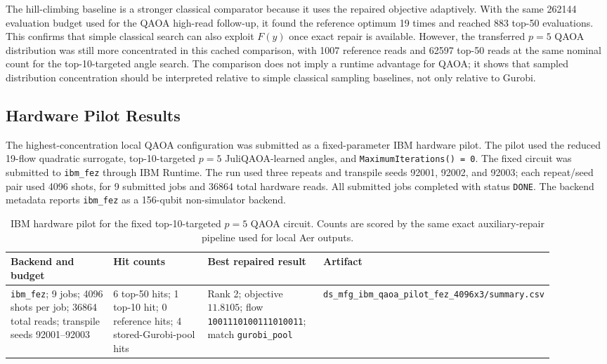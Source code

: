 The hill-climbing baseline is a stronger classical comparator because it uses
the repaired objective adaptively. With the same 262144 evaluation budget used
for the QAOA high-read follow-up, it found the reference optimum 19 times and
reached 883 top-50 evaluations. This confirms that simple classical search can
also exploit $F(y)$ once exact repair is available. However, the transferred
$p=5$ QAOA distribution was still more concentrated in this cached comparison,
with 1007 reference reads and 62597 top-50 reads at the same nominal count for the
top-10-targeted angle search. The
comparison does not imply a runtime advantage for QAOA; it shows that sampled
distribution concentration should be interpreted relative to simple classical
sampling baselines, not only relative to Gurobi.

\subsection{Hardware Pilot Results}
\label{subsec:ds-mfg-hardware-pilot}

The highest-concentration local QAOA configuration was submitted as a fixed-parameter IBM
hardware pilot. The pilot used the reduced 19-flow quadratic surrogate,
top-10-targeted $p=5$ JuliQAOA-learned angles, and
\texttt{MaximumIterations() = 0}. The fixed circuit was submitted to
\texttt{ibm\_fez} through IBM Runtime. The run used three repeats and
transpile seeds 92001, 92002, and 92003; each repeat/seed pair used 4096 shots,
for 9 submitted jobs and 36864 total hardware reads. All submitted jobs
completed with status \texttt{DONE}. The backend metadata reports
\texttt{ibm\_fez} as a 156-qubit non-simulator backend.

\begin{table}[t]
\centering
\scriptsize
\caption{IBM hardware pilot for the fixed top-10-targeted $p=5$ QAOA circuit.
Counts are scored by the same exact auxiliary-repair pipeline used for local
Aer outputs.}
\label{tab:ds-mfg-hardware-pilot}
\begin{tabular}{p{0.24\linewidth}p{0.22\linewidth}p{0.22\linewidth}p{0.22\linewidth}}
\hline
Backend and budget & Hit counts & Best repaired result & Artifact \\
\hline
\texttt{ibm\_fez}; 9 jobs; 4096 shots per job; 36864 total reads; transpile
seeds 92001--92003 & 6 top-50 hits; 1 top-10 hit; 0 reference hits; 4
stored-Gurobi-pool hits & Rank 2; objective $11.8105$; flow
\texttt{1001110100111010011}; match \texttt{gurobi\_pool} &
\texttt{ds\_mfg\_ibm\_qaoa\_pilot\_fez\_4096x3/summary.csv} \\
\hline
\end{tabular}
\end{table}

